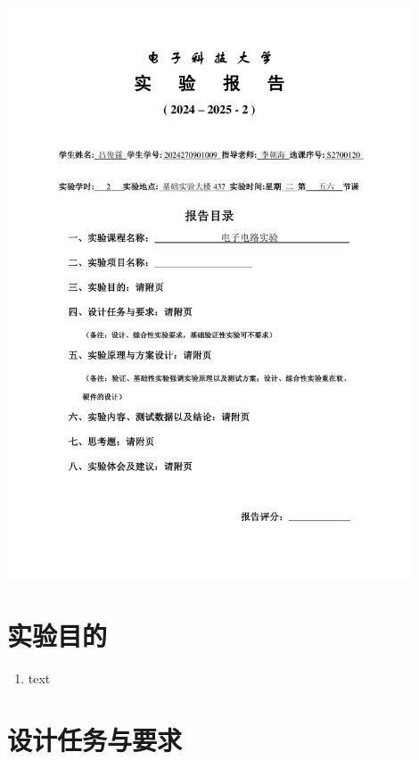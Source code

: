 \documentclass[10pt, a4paper]{article} %
\begin{document}
\begin{titlepage}
    \centering
    \includegraphics[page=1, width=0.9\textwidth, keepaspectratio]{image/实验报告撰写封面.pdf}
    \restoregeometry
\end{titlepage}

\setcounter{section}{2}

\section{实验目的}

\begin{enumerate}[leftmargin=50pt,label=(\arabic*)] %
    \item text
\end{enumerate}

\section{设计任务与要求}
\end{document}
